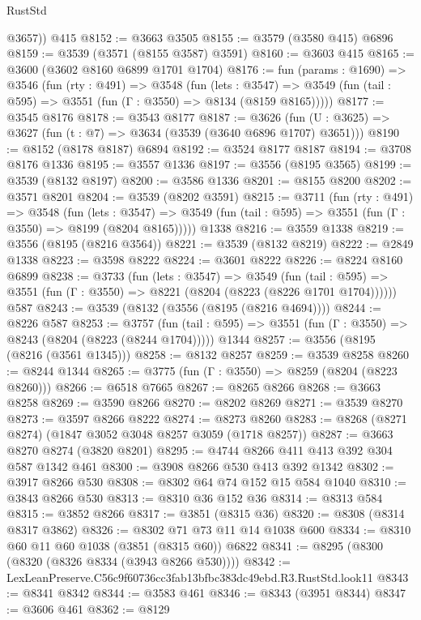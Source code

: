 \begin{lexlean}{RustStd}
\begin{coremodule}
        @3657))
    @415
@8152 := @3663 @3505
@8155 := @3579 (@3580 @415) @6896
@8159 := @3539 (@3571 (@8155 @3587) @3591)
@8160 := @3603 @415
@8165 := @3600 (@3602 @8160 @6899 @1701 @1704)
@8176 := fun (params : @1690) =>
  @3546
    (fun (rty : @491) =>
    @3548
      (fun (lets : @3547) =>
      @3549 (fun (tail : @595) => @3551 (fun (Γ : @3550) => @8134 (@8159 @8165)))))
@8177 := @3545 @8176
@8178 := @3543 @8177
@8187 := @3626 (fun (U : @3625) => @3627 (fun (t : @7) => @3634 (@3539 (@3640 @6896 @1707) @3651)))
@8190 := @8152 (@8178 @8187) @6894
@8192 := @3524 @8177 @8187
@8194 := @3708 @8176 @1336
@8195 := @3557 @1336
@8197 := @3556 (@8195 @3565)
@8199 := @3539 (@8132 @8197)
@8200 := @3586 @1336
@8201 := @8155 @8200
@8202 := @3571 @8201
@8204 := @3539 (@8202 @3591)
@8215 := @3711
    (fun (rty : @491) =>
    @3548
      (fun (lets : @3547) =>
      @3549 (fun (tail : @595) => @3551 (fun (Γ : @3550) => @8199 (@8204 @8165)))))
    @1338
@8216 := @3559 @1338
@8219 := @3556 (@8195 (@8216 @3564))
@8221 := @3539 (@8132 @8219)
@8222 := @2849 @1338
@8223 := @3598 @8222
@8224 := @3601 @8222
@8226 := @8224 @8160 @6899
@8238 := @3733
    (fun (lets : @3547) =>
    @3549
      (fun (tail : @595) => @3551 (fun (Γ : @3550) => @8221 (@8204 (@8223 (@8226 @1701 @1704))))))
    @587
@8243 := @3539 (@8132 (@3556 (@8195 (@8216 @4694))))
@8244 := @8226 @587
@8253 := @3757
    (fun (tail : @595) => @3551 (fun (Γ : @3550) => @8243 (@8204 (@8223 (@8244 @1704)))))
    @1344
@8257 := @3556 (@8195 (@8216 (@3561 @1345)))
@8258 := @8132 @8257
@8259 := @3539 @8258
@8260 := @8244 @1344
@8265 := @3775 (fun (Γ : @3550) => @8259 (@8204 (@8223 @8260)))
@8266 := @6518 @7665
@8267 := @8265 @8266
@8268 := @3663 @8258
@8269 := @3590 @8266
@8270 := @8202 @8269
@8271 := @3539 @8270
@8273 := @3597 @8266 @8222
@8274 := @8273 @8260
@8283 := @8268 (@8271 @8274) (@1847 @3052 @3048 @8257 @3059 (@1718 @8257))
@8287 := @3663 @8270 @8274 (@3820 @8201)
@8295 := @4744 @8266 @411 @413 @392 @304 @587 @1342 @461
@8300 := @3908 @8266 @530 @413 @392 @1342
@8302 := @3917 @8266 @530
@8308 := @8302 @64 @74 @152 @15 @584 @1040
@8310 := @3843 @8266 @530
@8313 := @8310 @36 @152 @36
@8314 := @8313 @584
@8315 := @3852 @8266
@8317 := @3851 (@8315 @36)
@8320 := @8308 (@8314 @8317 @3862)
@8326 := @8302 @71 @73 @11 @14 @1038 @600
@8334 := @8310 @60 @11 @60 @1038 (@3851 (@8315 @60)) @6822
@8341 := @8295 (@8300 (@8320 (@8326 @8334 (@3943 @8266 @530))))
@8342 := LexLeanPreserve.C56c9f60736cc3fab13bfbc383dc49ebd.R3.RustStd.look11
@8343 := @8341 @8342
@8344 := @3583 @461
@8346 := @8343 (@3951 @8344)
@8347 := @3606 @461
@8362 := @8129

\end{coremodule}
\end{lexlean}
